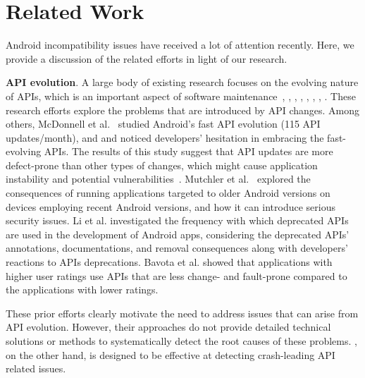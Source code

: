 \section{Related Work}\label{sec-related}

Android incompatibility issues have received a lot of
attention recently. Here, we provide a discussion of the
related efforts in light of our research.

\textbf{API evolution}. A large body of existing research
focuses on the evolving nature of APIs, which is an
important aspect of software
maintenance~\cite{mcdonnell2013empirical},
\cite{bavota2015impact}, \cite{li2018characterising},
\cite{lamothe2018exploring}, \cite{linares2013api},
\cite{Fazzini:2017:ACI:3155562.3155604},
\cite{mahmoudi2018android}, \cite{mutchler2016target}. These
research efforts  explore the problems that are introduced
by API changes. Among others, McDonnell et
al.~\cite{mcdonnell2013empirical} studied Android's fast API
evolution (115 API updates/month), and and noticed developers'
hesitation in embracing the fast-evolving APIs. The results
of this study suggest that API updates are more defect-prone
than other types of changes, which might cause application
instability and potential vulnerabilities~\cite{linares2013api}.
Mutchler et al.~\cite{mutchler2016target} explored the consequences of
running applications targeted to older Android versions on
devices employing recent Android versions, and how it can
introduce serious security issues. Li et al.
\cite{li2018characterising} investigated the frequency with
which deprecated APIs are used in the development of Android
apps, considering the deprecated APIs' annotations,
documentations, and removal consequences along with
developers' reactions to APIs deprecations. Bavota et al.
\cite{bavota2015impact} showed that applications with higher
user ratings use APIs that are less change- and fault-prone
compared to the applications with lower ratings. 

%


These prior efforts clearly motivate the need to address
issues that can arise from API evolution.  However, their
approaches do not provide detailed technical solutions or
methods to systematically detect the root causes of these
problems.  \textsc{\@approach}, on the other hand, is
designed to be effective at detecting crash-leading API
related issues.

